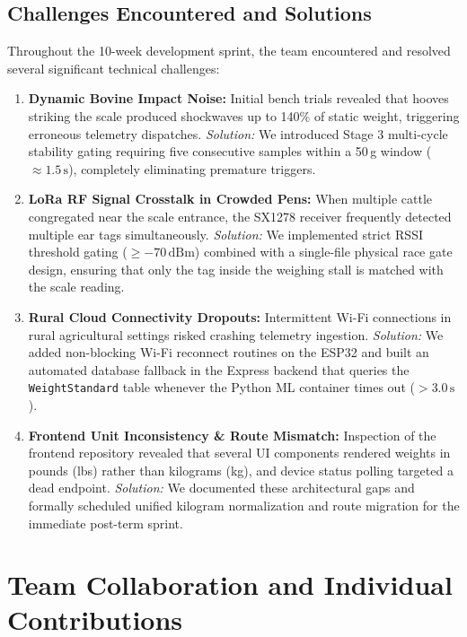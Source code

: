 \documentclass[11pt,a4paper]{report}
\begin{document}
\section{Challenges Encountered and Solutions}
Throughout the 10-week development sprint, the team encountered and resolved several significant technical challenges:
\begin{enumerate}
    \item \textbf{Dynamic Bovine Impact Noise:} Initial bench trials revealed that hooves striking the scale produced shockwaves up to 140\% of static weight, triggering erroneous telemetry dispatches. \textit{Solution:} We introduced Stage 3 multi-cycle stability gating requiring five consecutive samples within a 50\,g window ($\approx 1.5\,\text{s}$), completely eliminating premature triggers.
    \item \textbf{LoRa RF Signal Crosstalk in Crowded Pens:} When multiple cattle congregated near the scale entrance, the SX1278 receiver frequently detected multiple ear tags simultaneously. \textit{Solution:} We implemented strict RSSI threshold gating ($\ge -70\,\text{dBm}$) combined with a single-file physical race gate design, ensuring that only the tag inside the weighing stall is matched with the scale reading.
    \item \textbf{Rural Cloud Connectivity Dropouts:} Intermittent Wi-Fi connections in rural agricultural settings risked crashing telemetry ingestion. \textit{Solution:} We added non-blocking Wi-Fi reconnect routines on the ESP32 and built an automated database fallback in the Express backend that queries the \texttt{WeightStandard} table whenever the Python ML container times out ($> 3.0\,\text{s}$).
    \item \textbf{Frontend Unit Inconsistency \& Route Mismatch:} Inspection of the frontend repository revealed that several UI components rendered weights in pounds (lbs) rather than kilograms (kg), and device status polling targeted a dead endpoint. \textit{Solution:} We documented these architectural gaps and formally scheduled unified kilogram normalization and route migration for the immediate post-term sprint.
\end{enumerate}

\clearpage

\chapter{Team Collaboration and Individual Contributions}
\end{document}

